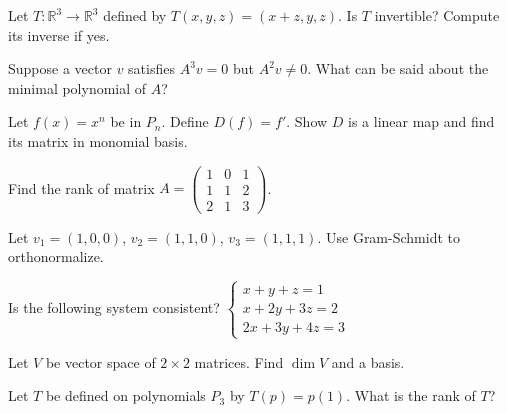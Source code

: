 \documentclass[11pt]{article}
\begin{document}
\begin{problem}
Let $T: \mathbb{R}^3 \to \mathbb{R}^3$ defined by $T(x,y,z) = (x+z, y, z)$. Is $T$ invertible? Compute its inverse if yes.
\end{problem}

\begin{problem}
Suppose a vector $v$ satisfies $A^3v = 0$ but $A^2v \neq 0$. What can be said about the minimal polynomial of $A$?
\end{problem}

\begin{problem}
Let $f(x) = x^n$ be in $P_n$. Define $D(f) = f'$. Show $D$ is a linear map and find its matrix in monomial basis.
\end{problem}

\begin{problem}
Find the rank of matrix $A = \begin{pmatrix}1 & 0 & 1 \\ 1 & 1 & 2 \\ 2 & 1 & 3\end{pmatrix}$.
\end{problem}

\begin{problem}
Let $v_1 = (1,0,0)$, $v_2 = (1,1,0)$, $v_3 = (1,1,1)$. Use Gram-Schmidt to orthonormalize.
\end{problem}

\begin{problem}
Is the following system consistent? 
$
\begin{cases}
x + y + z = 1 \\
x + 2y + 3z = 2 \\
2x + 3y + 4z = 3
\end{cases}
$
\end{problem}

\begin{problem}
Let $V$ be vector space of $2\times 2$ matrices. Find $\dim V$ and a basis.
\end{problem}

\begin{problem}
Let $T$ be defined on polynomials $P_3$ by $T(p) = p(1)$. What is the rank of $T$?
\end{problem}
\end{document}
